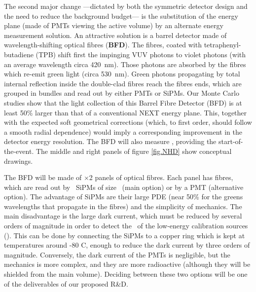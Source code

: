 \indent

The second major change ---dictated by both the symmetric detector design and the need to reduce the background budget--- is the substitution of the energy plane (made of PMTs viewing the active volume) by an alternate energy measurement solution.  An attractive solution is a barrel detector made of wavelength-shifting optical fibres ({\bf BFD}). The fibres, coated with tetraphenyl-butadiene (TPB) shift first the impinging VUV photons to violet photons (with an average wavelength circa \SI{420}{\nm}). Those photons are absorbed by the fibres which re-emit green light (circa  \SI{530}{\nm}). Green photons propagating by total internal reflection inside the double-clad fibres reach the fibres ends, which are grouped in bundles and read out by either PMTs or SiPMs. Our Monte Carlo studies show that the light collection of this Barrel Fibre Detector (BFD) is at least 50\% larger than that of a conventional NEXT energy plane. This, together with the expected soft geometrical corrections (which, to first order, should follow a smooth radial dependence) would imply a corresponding improvement in the detector energy resolution. The BFD will also measure \sone, providing the start-of-the-event.  The middle and right panels of figure \ref{fig.NHD} show conceptual drawings. 

\indent


The BFD will be made of \BFDNP$\times$2 panels of optical fibres. Each panel has \BFDNFPP fibres, which are read out by \BFDNSIPMPP\ SiPMs
of size \BFDNSIPM\ (main option) or by a PMT (alternative option). The advantage of SiPMs are their large PDE (near 50\% for the greens wavelengths that propagate in the fibres) and the simplicity of mechanics. The main disadvantage is the large dark current, which must be reduced by several orders of magnitude in order to detect the \sone\ of the low-energy calibration sources (). This can be done by connecting the SiPMs to a copper ring which is kept at temperatures around -80 C, enough to reduce the dark current by three orders of magnitude. Conversely, the dark current of the PMTs is negligible, but the mechanics is more complex, and they are more radioactive (although they will be shielded from the main volume). Deciding between these two options will be one of the
deliverables of our proposed R\&D. 


\indent

